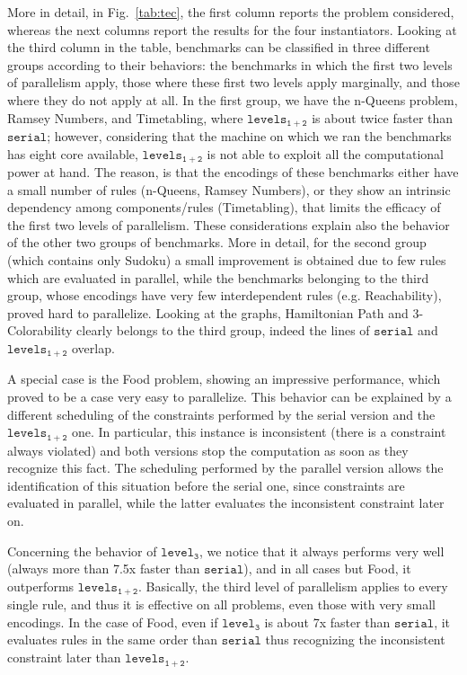 \documentclass[preprint]{tlp}
\newcommand{\serial}{\ensuremath{\mathtt{serial}}\xspace}
\newcommand{\kali}{\ensuremath{\mathtt{levels_{1\!+\!2}}}\xspace}
\newcommand{\splitonly}{\ensuremath{\mathtt{level_3}}\xspace}
\begin{document}
More in detail, in Fig.~\ref{tab:tec},
the first column reports the problem considered, whereas the next columns report
the results for the four instantiators.
Looking at the third column in the table, benchmarks can be classified in three different groups
according to their behaviors: the benchmarks in which the first two levels of parallelism
apply, those where these first two levels apply marginally, and those where they do not apply at all.
In the first group, we have the n-Queens problem, Ramsey Numbers, and Timetabling,
where \kali is about twice faster than $\serial$; however,
considering that the machine on which we ran the benchmarks has eight core available,
$\kali$ is not able to exploit all the computational power at hand.
The reason, is that the encodings of these benchmarks either have a small number of rules
(n-Queens, Ramsey Numbers), or they show an intrinsic dependency among
components/rules (Timetabling), that limits the efficacy of the first two levels of parallelism.
These considerations explain also the behavior of the other two groups of benchmarks. More in detail, for the second group (which contains only Sudoku)
a small improvement is obtained due to few rules which are evaluated in parallel, while the benchmarks belonging to the third group, whose encodings have very few interdependent rules (e.g. Reachability), proved hard to parallelize. Looking at the graphs, Hamiltonian Path and 3-Colorability clearly belongs to the third group, indeed the lines of \serial and \kali overlap.

A special case is the Food problem, showing an impressive performance,
which proved to be a case very easy to parallelize.
This behavior can be explained by a different scheduling of the constraints performed
by the serial version and the \kali one. In particular, this instance is inconsistent
(there is a constraint always violated) and both versions stop the
computation as soon as they recognize this fact. The scheduling
performed by the parallel version allows the identification of this situation before
the serial one, since constraints are evaluated in parallel, while the latter
evaluates the inconsistent constraint later on.


Concerning the behavior of \splitonly, we notice that it always performs very well (always more than 7.5x faster than \serial), and
in all cases but Food, it outperforms \kali.
Basically, the third level of parallelism applies to every single rule, and thus it is effective on all problems, even those with very small encodings.
In the case of Food, even if \splitonly is about 7x faster than \serial, it evaluates rules in the same order than \serial thus recognizing the inconsistent constraint
later than \kali.
\end{document}
